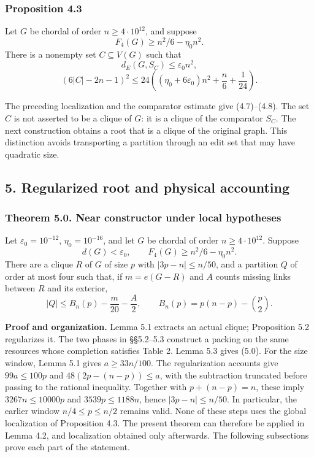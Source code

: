 \documentclass[english,11pt,a4paper]{article}
\newcounter{none}
\begin{document}
\subsubsection{Proposition 4.3}\label{proposition-4.3}

Let \(G\) be chordal of order \(n\ge4\cdot10^{12}\), and suppose \[
F_4(G)\ge n^2/6-\eta_0n^2.
\] There is a nonempty set \(C\subseteq V(G)\) such that \[
d_E(G,S_C)\le\varepsilon_0n^2,
\tag{4.7}
\] \[
(6|C|-2n-1)^2
\le24\left((\eta_0+6\varepsilon_0)n^2+\frac n6+\frac1{24}\right).
\tag{4.8}
\]

The preceding localization and the comparator estimate give (4.7)--(4.8). The set \(C\) is not asserted to be a clique of \(G\): it is a clique of the comparator \(S_C\). The next construction obtains a root that is a clique of the original graph. This distinction avoids transporting a partition through an edit set that may have quadratic size.

\subsection{5. Regularized root and physical accounting}\label{regularized-root-and-physical-accounting}

\subsubsection{Theorem 5.0. Near constructor under local hypotheses}\label{theorem-5.0.-near-constructor-under-local-hypotheses}

Let \(\varepsilon_0=10^{-12}\), \(\eta_0=10^{-16}\), and let \(G\) be chordal of order \(n\ge4\cdot10^{12}\). Suppose \[
d(G)<\varepsilon_0,\qquad F_4(G)\ge n^2/6-\eta_0n^2.
\] There are a clique \(R\) of \(G\) of size \(p\) with \(|3p-n|\le n/50\), and a partition \(Q\) of order at most four such that, if \(m=e(G-R)\) and \(A\) counts missing links between \(R\) and its exterior, \[
|Q|\le B_n(p)-\frac m{20}-\frac A2,\qquad
B_n(p)=p(n-p)-\binom p2.
\tag{5.0}
\]

\textbf{Proof and organization.} Lemma 5.1 extracts an actual clique; Proposition 5.2 regularizes it. The two phases in §§5.2--5.3 construct a packing on the same resources whose completion satisfies Table 2. Lemma 5.3 gives (5.0). For the size window, Lemma 5.1 gives \(a\ge33n/100\). The regularization accounts give \(99a\le100p\) and \(48(2p-(n-p))\le a\), with the subtraction truncated before passing to the rational inequality. Together with \(p+(n-p)=n\), these imply \(3267n\le10000p\) and \(3539p\le1188n\), hence \(|3p-n|\le n/50\). In particular, the earlier window \(n/4\le p\le n/2\) remains valid. None of these steps uses the global localization of Proposition 4.3. The present theorem can therefore be applied in Lemma 4.2, and localization obtained only afterwards. The following subsections prove each part of the statement.
\end{document}

